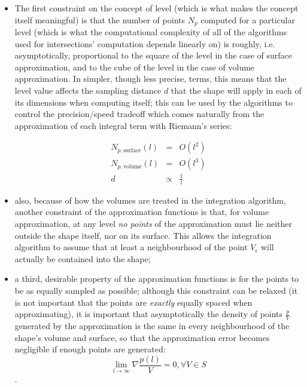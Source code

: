 \begin{itemize}
  \item{The first constraint on the  concept of level
      (which is what makes the concept itself meaningful) is that the number of points
      $N_p$
      computed for a particular level (which is what the computational complexity of
      all of the algorithms used for intersections' computation depends linearly on)
      is roughly, i.e. asymptotically, proportional to the square of the level in the
      case of surface approximation, and to the cube of the level in the case of
      volume approximation. In simpler, though less precise, terms, this means that
      the level value affects the sampling distance $d$ that the shape will apply in each
      of its dimensions when computing itself; this can be used by the algorithms to
      control the precision/speed tradeoff which comes naturally from the
      approximation of each integral term with Riemann's series:

      \begin{eqnarray}
        N_{p,\text{surface}}(l)& = & O(l^2) \\
        N_{p,\text{volume}}(l) & = & O(l^3) \label{volume-l-3}\\
        d & \propto & \frac{1}{l}
      \end{eqnarray}
    }
  \item{also, because of how the volumes are treated in the integration
      algorithm, another constraint of the approximation functions is that, for
      volume approximation, at any level \emph{no points} of the approximation
      must lie neither outside the shape itself, nor on its surface. This allows the
      integration algorithm to assume that at least a neighbourhood of the point
    $V_{\epsilon}$ will actually be contained into the shape;}
  \item{a third, desirable property of the approximation functions is for the
      points to be as equally sampled as possible; although this constraint can be
      relaxed (it is not important that the points are \emph{exactly} equally
      spaced when approximating), it is important
      that asymptotically the density of points $\frac{p}{V}$ generated by the approximation
      is the same in every neighbourhood of the shape's volume and surface, so
      that the approximation error becomes negligible if enough points are
      generated:
      \begin{equation} \label{eqn:points_with_constant_density}
        \lim_{l \rightarrow \infty} \nabla \frac{p(l)}{V} = 0, \forall V
        \in S
    \end{equation}.
  }
\end{itemize}

